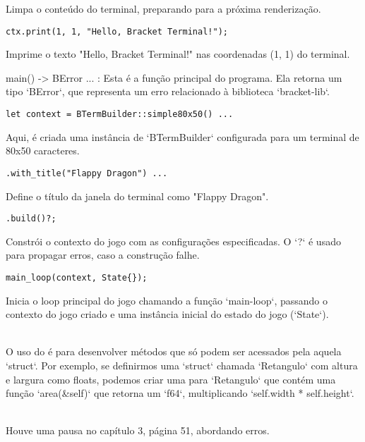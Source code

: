 \documentclass{article}
\begin{document}
Limpa o conteúdo do terminal, preparando para a próxima renderização.

\begin{verbatim}
ctx.print(1, 1, "Hello, Bracket Terminal!");
\end{verbatim}

Imprime o texto "Hello, Bracket Terminal!" nas coordenadas (1, 1) do terminal.

\fn main() -> BError { ... }: Esta é a função principal do programa. Ela retorna um tipo `BError`, que representa um erro relacionado à biblioteca `bracket-lib`.

\begin{verbatim}
let context = BTermBuilder::simple80x50() ...
\end{verbatim}

Aqui, é criada uma instância de `BTermBuilder` configurada para um terminal de 80x50 caracteres.

\begin{verbatim}
.with_title("Flappy Dragon") ...
\end{verbatim}

Define o título da janela do terminal como "Flappy Dragon".

\begin{verbatim}
.build()?;
\end{verbatim}

Constrói o contexto do jogo com as configurações especificadas. O `?` é usado para propagar erros, caso a construção falhe.

\begin{verbatim}
main_loop(context, State{});
\end{verbatim}

Inicia o loop principal do jogo chamando a função `main-loop`, passando o contexto do jogo criado e uma instância inicial do estado do jogo (`State{}`).

\\

O uso do \impl{} é para desenvolver métodos que só podem ser acessados pela aquela `struct`. Por exemplo, se definirmos uma `struct` chamada `Retangulo` com altura e largura como floats, podemos criar uma \impl{} para `Retangulo` que contém uma função \fn{} `area(&self)` que retorna um `f64`, multiplicando `self.width * self.height`.

\\

Houve uma pausa no capítulo 3, página 51, abordando erros.
\end{document}
